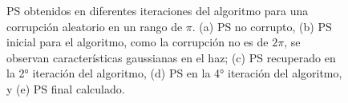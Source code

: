 \begin{figure}[ht!]
	\centering
	\caption[Espectros de potencia para una escala de corrupción aleatoria de $\pi$]{PS obtenidos en diferentes iteraciones del algoritmo para una corrupción aleatorio en un rango de $\pi$. (a) PS no corrupto, (b) PS inicial para el algoritmo, como la corrupción no es de $2\pi$, se observan características gaussianas en el haz; (c) PS recuperado en la 2° iteración del algoritmo, (d) PS en la 4° iteración del algoritmo, y (e) PS final calculado.}
	\label{fig:ps_pi}
\end{figure}

